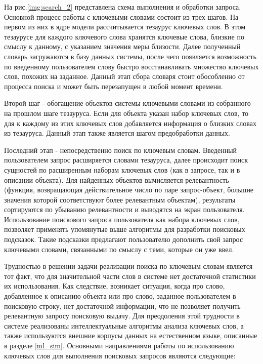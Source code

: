На рис.\ref{img:search_2} представлена схема выполнения и обработки запроса. Основной процесс работы с ключевыми словами состоит из трех шагов. На первом из них в ядре модели рассчитывается тезаурус ключевых слов. В этом тезаурусе для каждого ключевого слова хранятся ключевые слова, близкие по смыслу к данному, с указанием значения меры близости. Далее полученный словарь загружаются в базу данных системы, после чего появляется возможность по введенному пользователем слову быстро восстанавливать множество ключевых слов, похожих на заданное. Данный этап сбора словаря стоит обособленно от процесса поиска и может быть перезапущен в любой момент времени. 

Второй шаг - обогащение объектов системы ключевыми словами из собранного на прошлом шаге тезауруса. Если для объекта указан набор ключевых слов, то для к каждому из этих ключевых слов добавляется информация о близких словах из тезауруса. Данный этап также является шагом предобработки данных. 

Последний этап - непосредственно поиск по ключевым словам. Введенный пользователем запрос расширяется словами тезауруса, далее происходит поиск сущностей по расширенным наборам ключевых слов (как в запросе, так и в описании объекта). Для найденных объектов вычисляется релевантность (функция, возвращающая действительное число по паре запрос-объект, большие значения которой соответствуют более релевантным объектам), результаты сортируются по убыванию релевантности и выводятся на экран пользователя. Использование поискового запроса пользователя как набора ключевых слов, позволяет применять упомянутые выше алгоритмы для разработки поисковых подсказок. Такие подсказки предлагают пользователю дополнить свой запрос ключевыми словами, связанными по смыслу с теми, которые он уже ввел.

Трудностью в решении задачи реализации поиска по ключевым словам является тот факт, что для значительной части слов в системе нет достаточной статистики их использования. Как следствие, возникает ситуация, когда про слово, добавленное к описанию объекта или про слово, заданное пользователем в поисковую строку, нет достаточной информации, что не позволяет получить релевантную запросу поисковую выдачу. Для преодоления этой трудности в системе реализованы интеллектуальные алгоритмы анализа ключевых слов, а также используются внешние корпусы данных на естественном языке, описанные в разделе \ref{ml_sim}. Основными направлениями работы по использованию ключевых слов для выполнения поисковых запросов являются следующие:

